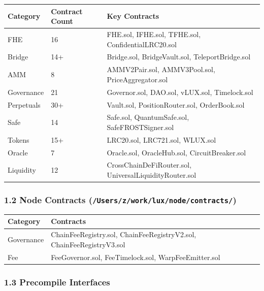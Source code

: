 \documentclass[
]{article}
\newcounter{none} %
\begin{document}
{\def\LTcaptype{none} %
\begin{longtable}[]{@{}lll@{}}
\toprule\noalign{}
Category & Contract Count & Key Contracts \\
\midrule\noalign{}
\endhead
\bottomrule\noalign{}
\endlastfoot
FHE & 16 & FHE.sol, IFHE.sol, TFHE.sol, ConfidentialLRC20.sol \\
Bridge & 14+ & Bridge.sol, BridgeVault.sol, TeleportBridge.sol \\
AMM & 8 & AMMV2Pair.sol, AMMV3Pool.sol, PriceAggregator.sol \\
Governance & 21 & Governor.sol, DAO.sol, vLUX.sol, Timelock.sol \\
Perpetuals & 30+ & Vault.sol, PositionRouter.sol, OrderBook.sol \\
Safe & 14 & Safe.sol, QuantumSafe.sol, SafeFROSTSigner.sol \\
Tokens & 15+ & LRC20.sol, LRC721.sol, WLUX.sol \\
Oracle & 7 & Oracle.sol, OracleHub.sol, CircuitBreaker.sol \\
Liquidity & 12 & CrossChainDeFiRouter.sol,
UniversalLiquidityRouter.sol \\
\end{longtable}
}

\subsubsection{\texorpdfstring{1.2 Node Contracts
(\texttt{/Users/z/work/lux/node/contracts/})}{1.2 Node Contracts (/Users/z/work/lux/node/contracts/)}}\label{12-node-contracts-userszworkluxnodecontracts}

{\def\LTcaptype{none} %
\begin{longtable}[]{@{}ll@{}}
\toprule\noalign{}
Category & Contracts \\
\midrule\noalign{}
\endhead
\bottomrule\noalign{}
\endlastfoot
Governance & ChainFeeRegistry.sol, ChainFeeRegistryV2.sol,
ChainFeeRegistryV3.sol \\
Fee & FeeGovernor.sol, FeeTimelock.sol, WarpFeeEmitter.sol \\
\end{longtable}
}

\subsubsection{1.3 Precompile
Interfaces}\label{13-precompile-interfaces}
\end{document}
